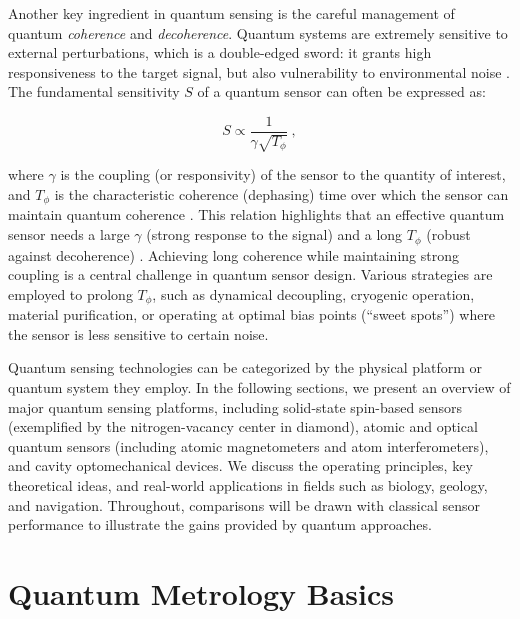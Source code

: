 Another key ingredient in quantum sensing is the careful management of
quantum \textit{coherence} and \textit{decoherence}. Quantum systems
are extremely sensitive to external perturbations, which is a
double-edged sword: it grants high responsiveness to the target
signal, but also vulnerability to environmental noise . The
fundamental sensitivity $S$ of a quantum sensor can often be expressed
as:

\begin{equation}\label{eq:sensitivity}

S \propto \frac{1}{\gamma \sqrt{T_{\phi}}}~,

\end{equation}

where $\gamma$ is the coupling (or responsivity) of the sensor to the
quantity of interest, and $T_{\phi}$ is the characteristic coherence
(dephasing) time over which the sensor can maintain quantum coherence
. This relation highlights that an effective quantum sensor needs a
large $\gamma$ (strong response to the signal) and a long $T_{\phi}$
(robust against decoherence) . Achieving long coherence while
maintaining strong coupling is a central challenge in quantum sensor
design. Various strategies are employed to prolong $T_{\phi}$, such as
dynamical decoupling, cryogenic operation, material purification, or
operating at optimal bias points (“sweet spots”) where the sensor is
less sensitive to certain noise.



Quantum sensing technologies can be categorized by the physical
platform or quantum system they employ. In the following sections, we
present an overview of major quantum sensing platforms, including
solid-state spin-based sensors (exemplified by the nitrogen-vacancy
center in diamond), atomic and optical quantum sensors (including
atomic magnetometers and atom interferometers), and cavity
optomechanical devices. We discuss the operating principles, key
theoretical ideas, and real-world applications in fields such as
biology, geology, and navigation. Throughout, comparisons will be
drawn with classical sensor performance to illustrate the gains
provided by quantum approaches.



\section{Quantum Metrology Basics}\label{sec:metrology}

